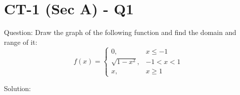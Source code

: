 \documentclass[11pt, a4paper]{article}
\begin{document}

\section*{CT-1 (Sec A) - Q1}

Question:
Draw the graph of the following function and find the domain and range of it:
\[ 
f(x) = \begin{cases} 
0, & x \le -1 \\ 
\sqrt{1-x^2}, & -1 < x < 1 \\ 
x, & x \ge 1 
\end{cases} 
\]

Solution:
\end{document}
